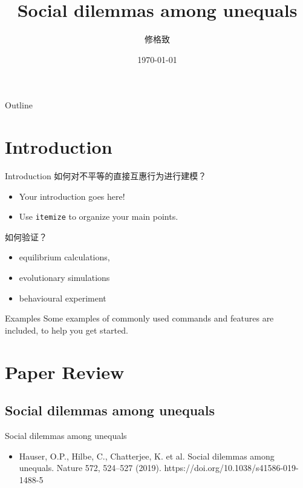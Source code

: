 \documentclass{beamer}
\title[Social dilemmas among unequals]{Social dilemmas among unequals}
\author{修格致}
\institute{PKU}
\date{\today}
\begin{document}
\begin{frame}
  \titlepage
\end{frame}

\begin{frame}{Outline}
 \tableofcontents
\end{frame}

\section{Introduction}

\begin{frame}{Introduction}
如何对不平等的直接互惠行为进行建模？
\begin{itemize}
  \item Your introduction goes here!
  \item Use \texttt{itemize} to organize your main points.
\end{itemize}
如何验证？
\begin{itemize}
    \item equilibrium calculations, 
    \item evolutionary simulations
    \item behavioural experiment
\end{itemize}

\vskip 1cm

\begin{block}{Examples}
Some examples of commonly used commands and features are included, to help you get started.
\end{block}

\end{frame}

\section{Paper Review}

\subsection{Social dilemmas among unequals}

\begin{frame}{Social dilemmas among unequals}

\begin{itemize}
    \item Hauser, O.P., Hilbe, C., Chatterjee, K. et al. Social dilemmas among unequals. Nature 572, 524–527 (2019). https://doi.org/10.1038/s41586-019-1488-5
\end{itemize}

\end{frame}
\end{document}
